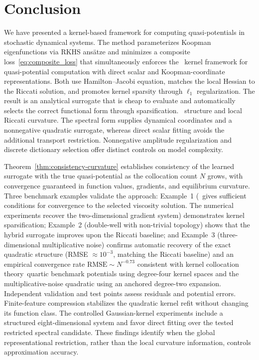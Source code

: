 \documentclass[11pt]{article}
\theoremstyle{plain}      %
\theoremstyle{definition} %
\providecommand{\DIFaddtex}[1]{{\protect\color{blue}#1}} %
\providecommand{\DIFdeltex}[1]{{\protect\color{red}#1}} %
\providecommand{\DIFaddbegin}{} %
\providecommand{\DIFaddend}{} %
\providecommand{\DIFdelbegin}{} %
\providecommand{\DIFdelend}{} %
\providecommand{\DIFadd}[1]{\texorpdfstring{\DIFaddtex{#1}}{#1}} %
\providecommand{\DIFdel}[1]{\texorpdfstring{\DIFdeltex{#1}}{}} %
\newcommand{\DIFscaledelfig}{1.0}
\newlength{\DIFdelgraphicswidth} %
\newlength{\DIFdelgraphicsheight} %
\newcommand{\DIFaddincludegraphics}[2][]{{\color{blue}\fbox{\DIFOincludegraphics[#1]{#2}}}} %
\newcommand{\DIFdelincludegraphics}[2][]{%
\sbox{\DIFdelgraphicsbox}{\DIFOincludegraphics[#1]{#2}}%
\settoboxwidth{\DIFdelgraphicswidth}{\DIFdelgraphicsbox} %
\settoboxtotalheight{\DIFdelgraphicsheight}{\DIFdelgraphicsbox} %
\scalebox{\DIFscaledelfig}{%
\parbox[b]{\DIFdelgraphicswidth}{\usebox{\DIFdelgraphicsbox}\\[-\baselineskip] \rule{\DIFdelgraphicswidth}{0em}}\llap{\resizebox{\DIFdelgraphicswidth}{\DIFdelgraphicsheight}{%
\setlength{\unitlength}{\DIFdelgraphicswidth}%
\begin{picture}(1,1)%
\thicklines\linethickness{2pt} %
{\color[rgb]{1,0,0}\put(0,0){\framebox(1,1){}}}%
{\color[rgb]{1,0,0}\put(0,0){\line( 1,1){1}}}%
{\color[rgb]{1,0,0}\put(0,1){\line(1,-1){1}}}%
\end{picture}%
}\hspace*{3pt}}} %
} %
\DeclareRobustCommand{\DIFaddbegin}{\DIFOaddbegin \let\includegraphics\DIFaddincludegraphics} %
\DeclareRobustCommand{\DIFaddend}{\DIFOaddend \let\includegraphics\DIFOincludegraphics} %
\DeclareRobustCommand{\DIFdelbegin}{\DIFOdelbegin \let\includegraphics\DIFdelincludegraphics} %
\DeclareRobustCommand{\DIFdelend}{\DIFOaddend \let\includegraphics\DIFOincludegraphics} %
\begin{document}
\FloatBarrier
\DIFaddend \section{Conclusion}

We have presented a \DIFdelbegin \DIFdel{kernel-based framework for computing quasi-potentials in stochastic dynamical systems. The method parameterizes Koopman eigenfunctions via RKHS ansätze and minimizes a composite loss~\eqref{eq:composite_loss} that simultaneously enforces the }\DIFdelend\ \DIFaddbegin \DIFadd{kernel framework for quasi-potential computation with direct scalar and Koopman-coordinate representations. Both use }\DIFaddend Hamilton--Jacobi \DIFdelbegin \DIFdel{equation, matches the local Hessian to the Riccati solution, and promotes kernel sparsity through $\ell_1$ regularization. The result is an analytical surrogate that is cheap to evaluate and automatically selects the correct functional form through sparsification. }\DIFdelend\ \DIFaddbegin \DIFadd{structure and local Riccati curvature. The spectral form supplies dynamical coordinates and a nonnegative quadratic surrogate, whereas direct scalar fitting avoids the additional transport restriction. Nonnegative amplitude regularization and discrete dictionary selection offer distinct controls on model complexity.
}\DIFaddend 

Theorem~\ref{thm:consistency-curvature} \DIFdelbegin \DIFdel{establishes consistency of the learned surrogate with the true quasi-potential as the collocation count $N$ grows, with convergence guaranteed in function values, gradients, and equilibrium curvature. Three benchmark examples validate the approach: Example~1 (}\DIFdelend\ \DIFaddbegin \DIFadd{gives sufficient conditions for convergence to the selected viscosity solution. The numerical experiments recover the }\DIFaddend two-dimensional \DIFdelbegin \DIFdel{gradient system) demonstrates kernel sparsification; Example~2 (double-well with non-trivial topology) shows that the hybrid surrogate improves upon the Riccati baseline; and Example~3 (three-dimensional multiplicative noise) confirms automatic recovery of the exact quadratic structure (RMSE $\approx 10^{-3}$, matching the Riccati baseline) and an empirical convergence rate $\text{RMSE}\sim N^{-0.73}$ consistent with kernel collocation theory}\DIFdelend\ \DIFaddbegin \DIFadd{quartic benchmark potentials using degree-four kernel spaces and the multiplicative-noise quadratic using an anchored degree-two expansion. Independent validation and test points assess residuals and potential errors. Finite-feature compression stabilizes the quadratic kernel refit without changing its function class. The controlled Gaussian-kernel experiments include a structured eight-dimensional system and favor direct fitting over the tested restricted spectral candidate. These findings identify when the global representational restriction, rather than the local curvature information, controls approximation accuracy}\DIFaddend .
\end{document}
